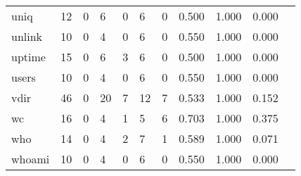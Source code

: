 \begin{longtable}{lp{1.10cm}p{1.10cm}p{1.10cm}p{1.10cm}p{1.10cm}p{1.10cm}p{1.10cm}p{1.10cm}p{1.10cm}p{1.10cm}}
uniq      &                     12 &                                  0 &                                 6 &                                0 &                                 6 &                               0 &                          0.500 &                                 1.000 &                               0.000 \\
unlink    &                     10 &                                  0 &                                 4 &                                0 &                                 6 &                               0 &                          0.550 &                                 1.000 &                               0.000 \\
uptime    &                     15 &                                  0 &                                 6 &                                3 &                                 6 &                               0 &                          0.500 &                                 1.000 &                               0.000 \\
users     &                     10 &                                  0 &                                 4 &                                0 &                                 6 &                               0 &                          0.550 &                                 1.000 &                               0.000 \\
vdir      &                     46 &                                  0 &                                20 &                                7 &                                12 &                               7 &                          0.533 &                                 1.000 &                               0.152 \\
wc        &                     16 &                                  0 &                                 4 &                                1 &                                 5 &                               6 &                          0.703 &                                 1.000 &                               0.375 \\
who       &                     14 &                                  0 &                                 4 &                                2 &                                 7 &                               1 &                          0.589 &                                 1.000 &                               0.071 \\
whoami    &                     10 &                                  0 &                                 4 &                                0 &                                 6 &                               0 &                          0.550 &                                 1.000 &                               0.000 \\

\end{longtable}
